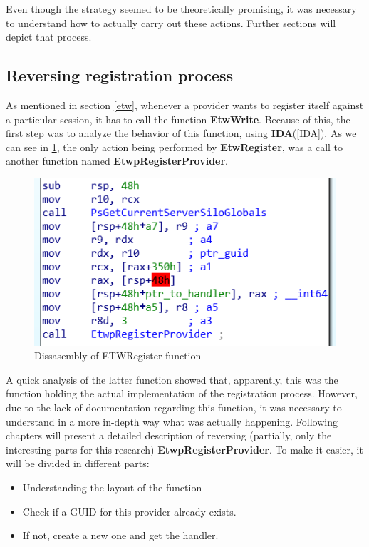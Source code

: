 Even though the strategy seemed to be theoretically promising, it was necessary to understand how to actually carry out these actions. Further sections will depict that process.













\subsection{Reversing registration process}
As mentioned in section \ref{etw}, whenever a provider wants to register itself against a particular session, it has to call the function {\bfseries EtwWrite}.
Because of this, the first step was to analyze the behavior of this function, using {\bfseries IDA}(\ref{IDA}). As we can see in \ref{fig:etwRegister_code}, the only action being performed by {\bfseries EtwRegister}, was a call to another function named {\bfseries EtwpRegisterProvider}. 

\begin{centering}
\begin{figure}[H]
  \includegraphics[width=12cm]{images/etwRegister_code.png}
  \caption[]{Dissasembly of ETWRegister function}
  \label{fig:etwRegister_code}
\end{figure}
\end{centering}

A quick analysis of the latter function showed that, apparently, this was the function holding the actual implementation of the registration process. However, due to the lack of documentation regarding this function, it was necessary to understand in a more in-depth way what was actually happening. Following chapters will present a detailed description of reversing (partially, only the interesting parts for this research) {\bfseries EtwpRegisterProvider}. 
To make it easier, it will be divided in different parts:
\begin{itemize}
  \item Understanding the layout of the function
  \item Check if a GUID for this provider already exists.
  \item If not, create a new one and get the handler.
\end{itemize}



